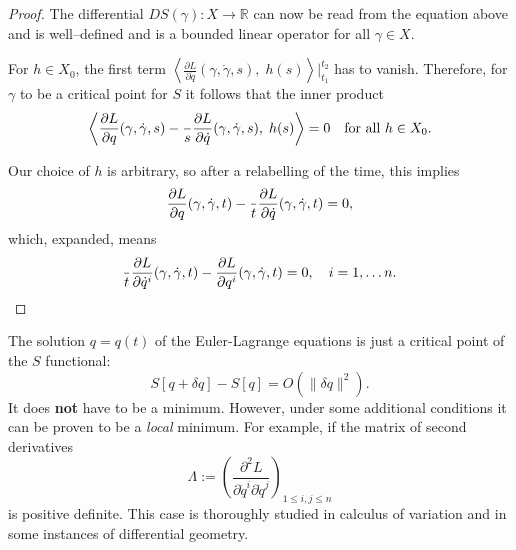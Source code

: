 \documentclass[english,fontsize=11pt,paper=a5,oneside]{scrbook}
\newcommand{\R}{\mathbb{R}}
\newcommand{\lag}{\langle}
\newcommand{\rag}{\rangle}
\let\d\relax
\DeclareMathOperator{\d}{d}
\theoremstyle{definition}
\newenvironment{remark}
  {\pushQED{\qed}\renewcommand{\qedsymbol}{$\lozenge$}\remarkx}
  {\popQED\endremarkx}
\begin{document}
\begin{proof}
    The differential $DS(\gamma): X \to \R$ can now be read from the equation above and is well--defined and is a bounded linear operator for all $\gamma\in X$.

    For $h\in X_0$, the first term $\left\lag\frac{\partial L}{\partial \dot q}(\gamma, \dot \gamma, s),\; h(s)\right\rag\Big|_{t_1}^{t_2}$ has to vanish. Therefore, for $\gamma$ to be a critical point for $S$ it follows that the inner product
    \begin{equation}
        \left\lag
            \frac{\partial L}{\partial q}(\gamma, \dot \gamma, s)
            - \frac{\d}{\d s}\frac{\partial L}{\partial \dot q}(\gamma, \dot \gamma, s)
        ,\; h(s)\right\rag = 0 \quad\mbox{for all } h\in X_0.
    \end{equation}

    Our choice of $h$ is arbitrary, so after a relabelling of the time, this implies
    \begin{equation}
        \frac{\partial L}{\partial q}(\gamma, \dot \gamma, t)
            - \frac{\d}{\d t}\frac{\partial L}{\partial \dot q}(\gamma, \dot \gamma, t) = 0,
    \end{equation}
    which, expanded, means
    \begin{equation}
        \frac{\d}{\d t}\frac{\partial L}{\partial \dot q^i}(\gamma, \dot \gamma, t) - \frac{\partial L}{\partial q^i}(\gamma, \dot \gamma, t) = 0, \quad i=1,\ldots n.
    \end{equation}
\end{proof}

\begin{remark}
    The solution $q=q(t)$ of the Euler-Lagrange equations is just a critical point of the $S$ functional:
    \begin{equation}
        S[q + \delta q] - S[q] = O(\|\delta q\|^2).
    \end{equation}
    It does \textbf{not} have to be a minimum. However, under some additional conditions it can be proven to be a \emph{local} minimum.
    For example, if the matrix of second derivatives
    \begin{equation}\label{eq:hsd}
        \Lambda := \left(
            \frac{\partial^2 L}{\partial\dot q^i \partial\dot q^j}
        \right)_{1\leq i,j\leq n}
    \end{equation}
    is positive definite.
    This case is thoroughly studied in calculus of variation and in some instances of differential geometry.
\end{remark}
\end{document}
